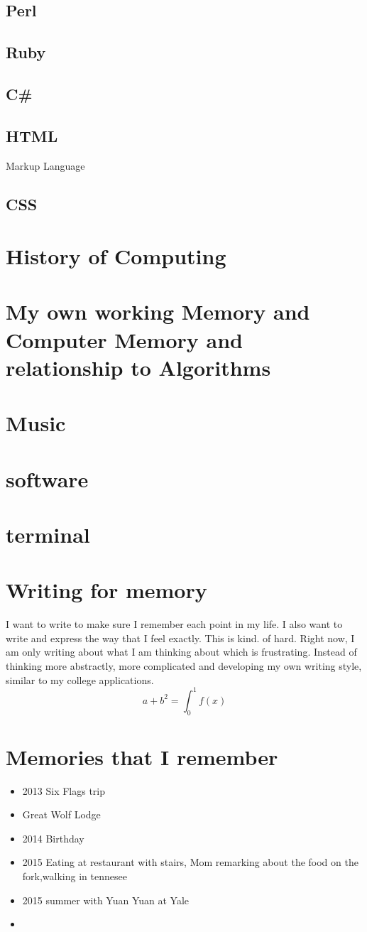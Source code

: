 \documentclass[11pt]{scrartcl}
\begin{document}
\subsection{Perl}
\subsection{Ruby}
\subsection{C#}
\subsection{HTML}
Markup Language
\subsection{CSS}
\section{History of Computing}
\section{My own working Memory and Computer Memory and relationship to Algorithms}
\section{Music}
\section{software}
\section{terminal}
\section{Writing for memory}
I want to write to make sure I remember each point in my life. I also want to write and express the way that I feel exactly. This is kind. of hard. Right now, I am only writing about what I am thinking about which is frustrating. Instead of thinking more abstractly, more complicated and developing my own writing style, similar to my college applications. $$a+b^2=\int_{0}^{1} f(x)$$
\section{Memories that I remember}
\begin{itemize}
    \item 2013 Six Flags trip
    \item Great Wolf Lodge
    \item 2014 Birthday
    \item 2015 Eating at restaurant with stairs, Mom remarking about the food on the fork,walking in tennesee
    \item 2015 summer with Yuan Yuan at Yale
    \item 
\end{itemize}
\end{document}
